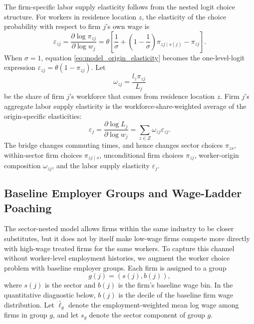 \documentclass[12pt]{article}
\begin{document}
The firm-specific labor supply elasticity follows from the nested logit choice structure. For workers in residence location \(z\), the elasticity of the choice probability with respect to firm \(j\)'s own wage is
\begin{equation}
    \varepsilon_{zj}
    =
    \frac{\partial \log \pi_{zj}}{\partial \log w_j}
    =
    \theta
    \left[
    \frac{1}{\sigma}
    +
    \left(1-\frac{1}{\sigma}\right)\pi_{zj\mid s(j)}
    -
    \pi_{zj}
    \right].
    \label{eq:model_origin_elasticity}
\end{equation}
When \(\sigma=1\), equation \eqref{eq:model_origin_elasticity} becomes the one-level-logit expression \(\varepsilon_{zj}=\theta(1-\pi_{zj})\).
Let
\[
    \omega_{zj}
    =
    \frac{l_z\pi_{zj}}{L_j}
\]
be the share of firm \(j\)'s workforce that comes from residence location \(z\). Firm \(j\)'s aggregate labor supply elasticity is the workforce-share-weighted average of the origin-specific elasticities:
\begin{equation}
    \varepsilon_j
    =
    \frac{\partial \log L_j}{\partial \log w_j}
    =
    \sum_{z\in Z}\omega_{zj}\varepsilon_{zj}.
    \label{eq:model_firm_elasticity}
\end{equation}
The bridge changes commuting times, and hence changes sector choices \(\pi_{zs}\), within-sector firm choices \(\pi_{zj\mid s}\), unconditional firm choices \(\pi_{zj}\), worker-origin composition \(\omega_{zj}\), and the labor supply elasticity \(\varepsilon_j\).

\subsection{Baseline Employer Groups and Wage-Ladder Poaching}
The sector-nested model allows firms within the same industry to be closer substitutes, but it does not by itself make low-wage firms compete more directly with high-wage treated firms for the same workers. To capture this channel without worker-level employment histories, we augment the worker choice problem with baseline employer groups. Each firm is assigned to a group
\[
    g(j)=\left(s(j),b(j)\right),
\]
where \(s(j)\) is the sector and \(b(j)\) is the firm's baseline wage bin. In the quantitative diagnostic below, \(b(j)\) is the decile of the baseline firm wage distribution. Let \(\bar{\ell}_g\) denote the employment-weighted mean log wage among firms in group \(g\), and let \(s_g\) denote the sector component of group \(g\).
\end{document}
